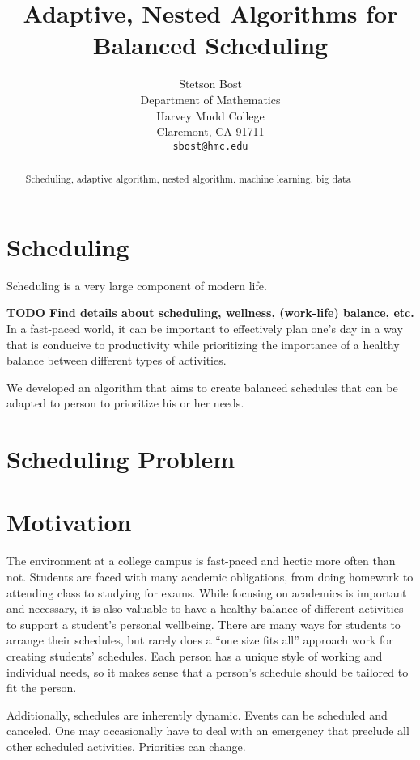 \documentclass{article}
\title{Adaptive, Nested Algorithms for Balanced Scheduling}
\author{
  Stetson Bost\\
  Department of Mathematics\\
  Harvey Mudd College\\
  Claremont, CA 91711 \\
  \texttt{sbost@hmc.edu}\\
}
\newcommand{\todo}[1]{{\bf TODO #1}\\}
\begin{document}

\maketitle

\begin{abstract}
Scheduling, adaptive algorithm, nested algorithm, machine learning, big data
\end{abstract}

\section{Scheduling}
	Scheduling is a very large component of modern life.

	\todo{Find details about scheduling, wellness, (work-life) balance, etc.}

	In a fast-paced world, it can be important to effectively plan one's day in a way that is conducive to productivity while prioritizing the importance of a healthy balance between different types of activities. 

	We developed an algorithm that aims to create balanced schedules that can be adapted to person to prioritize his or her needs.

\section{Scheduling Problem}


\section{Motivation}
	The environment at a college campus is fast-paced and hectic more often than not.
	Students are faced with many academic obligations, from doing homework to attending class to studying for exams.
	While focusing on academics is important and necessary, it is also valuable to have a healthy balance of different activities to support a student's personal wellbeing.
	There are many ways for students to arrange their schedules, but rarely does a ``one size fits all'' approach work for creating students' schedules.
	Each person has a unique style of working and individual needs, so it makes sense that a person's schedule should be tailored to fit the person.

	Additionally, schedules are inherently dynamic.
	Events can be scheduled and canceled.
	One may occasionally have to deal with an emergency that preclude all other scheduled activities.
	Priorities can change.
\end{document}
